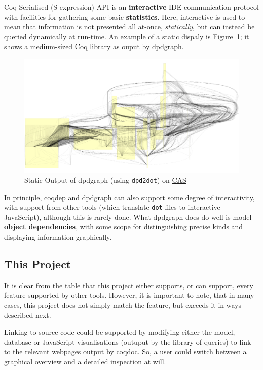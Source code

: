 Coq Serialised (S-expression) API is an \textbf{interactive} IDE communication
protocol with facilities for gathering some basic \textbf{statistics}. Here,
interactive is used to mean that information is not presented all at-once,
\emph{statically}, but can instead be queried dynamically at run-time. An
example of a static dispaly is Figure~\ref{fig:static}; it shows a medium-sized
Coq library as ouput by dpdgraph.

\begin{figure}[p]

  \centering
  \includegraphics[width=\textwidth, page=1]{img/static-CAS-small.pdf}
  \caption{Static Output of dpdgraph (using \texttt{dpd2dot}) on
    \href{https://github.com/Timothy-G-Griffin/CAS}{CAS}}\label{fig:static}

\end{figure}

In principle, coqdep and dpdgraph can also support some degree of interactivity,
with support from other tools (which translate \texttt{dot} files to interactive
JavaScript), although this is rarely done.  What dpdgraph does do well is model
\textbf{object dependencies}, with some scope for distinguishing precise kinds
and displaying information graphically.

\subsection{This Project}

It is clear from the table that this project either supports, or can support,
every feature supported by other tools. However, it is important to note, that
in many cases, this project does not simply match the feature, but exceeds it in
ways described next.

Linking to source code could be supported by modifying either the model,
database or JavaScript visualisations (outuput by the library of queries) to
link to the relevant webpages output by coqdoc. So, a user could switch between
a graphical overview and a detailed inspection at will.

